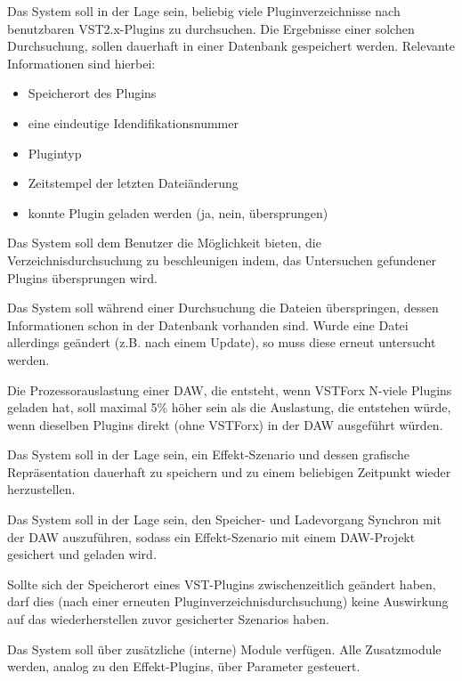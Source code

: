  Das System soll in der Lage sein, beliebig viele Pluginverzeichnisse nach benutzbaren VST2.x-Plugins zu durchsuchen. Die 
Ergebnisse einer solchen Durchsuchung, sollen dauerhaft in einer Datenbank gespeichert werden. Relevante Informationen sind hierbei: 

\begin{itemize}
	\item Speicherort des Plugins 
	\item eine eindeutige Idendifikationsnummer
	\item Plugintyp
	\item Zeitstempel der letzten Dateiänderung
	\item konnte Plugin geladen werden (ja, nein, übersprungen) 
\end{itemize}

 Das System soll dem Benutzer die Möglichkeit bieten, die Verzeichnisdurchsuchung zu beschleunigen indem, das Untersuchen gefundener Plugins übersprungen wird.

 Das System soll während einer Durchsuchung die Dateien überspringen, dessen Informationen schon in der Datenbank vorhanden sind. Wurde eine Datei allerdings geändert (z.B. nach einem Update), so muss diese erneut untersucht werden.

 Die Prozessorauslastung einer DAW, die entsteht, wenn VSTForx N-viele Plugins geladen hat, soll maximal 5\% höher sein als die Auslastung, die entstehen würde, wenn dieselben Plugins direkt (ohne VSTForx) in der DAW ausgeführt würden.

 Das System soll in der Lage sein, ein Effekt-Szenario und dessen grafische Repräsentation dauerhaft zu speichern und zu einem beliebigen Zeitpunkt wieder herzustellen.

 Das System soll in der Lage sein, den Speicher- und Ladevorgang Synchron mit der DAW auszuführen, sodass ein Effekt-Szenario mit einem DAW-Projekt gesichert und geladen wird.

 Sollte sich der Speicherort eines VST-Plugins zwischenzeitlich geändert haben, darf dies (nach einer erneuten Pluginverzeichnisdurchsuchung) keine Auswirkung auf das wiederherstellen zuvor gesicherter Szenarios haben.

 Das System soll über zusätzliche (interne) Module verfügen. Alle Zusatzmodule werden, analog zu den Effekt-Plugins, über Parameter gesteuert.

